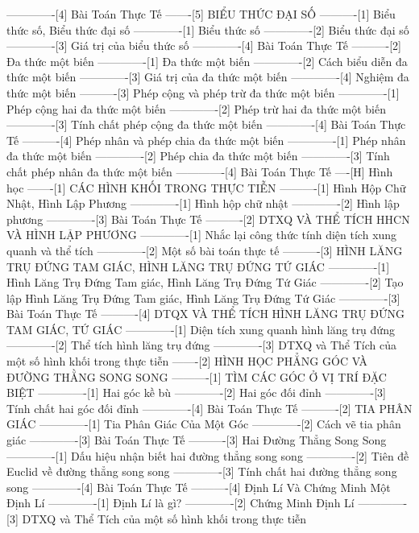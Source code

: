 -------------[4] Bài Toán Thực Tế
-------[5] BIỂU THỨC ĐẠI SỐ
----------[1] Biểu thức số, Biểu thức đại số
-------------[1] Biểu thức số
-------------[2] Biểu thức đại số
-------------[3] Giá trị của biểu thức số
-------------[4] Bài Toán Thực Tế
----------[2] Đa thức một biến
-------------[1] Đa thức một biến
-------------[2] Cách biểu diễn đa thức một biến
-------------[3] Giá trị của đa thức một biến
-------------[4] Nghiệm đa thức một biến
----------[3] Phép cộng và phép trừ đa thức một biến
-------------[1] Phép cộng hai đa thức một biến
-------------[2] Phép trừ hai đa thức một biến
-------------[3] Tính chất phép cộng đa thức một biến
-------------[4] Bài Toán Thực Tế
----------[4] Phép nhân và phép chia đa thức một biến
-------------[1] Phép nhân đa thức một biến
-------------[2] Phép chia đa thức một biến
-------------[3] Tính chất phép nhân đa thức một biến
-------------[4] Bài Toán Thực Tế
----[H] Hình học
-------[1] CÁC HÌNH KHỐI TRONG THỰC TIỄN
----------[1] Hình Hộp Chữ Nhật, Hình Lập Phương
-------------[1] Hình hộp chữ nhật
-------------[2] Hình lập phương
-------------[3] Bài Toán Thực Tế
----------[2] DTXQ VÀ THỂ TÍCH HHCN VÀ HÌNH LẬP PHƯƠNG
-------------[1] Nhắc lại công thức tính diện tích xung quanh và thể tích
-------------[2] Một số bài toán thực tế
----------[3] HÌNH LĂNG TRỤ ĐỨNG TAM GIÁC, HÌNH LĂNG TRỤ ĐỨNG TỨ GIÁC
-------------[1] Hình Lăng Trụ Đứng Tam giác, Hình Lăng Trụ Đứng Tứ Giác
-------------[2] Tạo lập Hình Lăng Trụ Đứng Tam giác, Hình Lăng Trụ Đứng Tứ Giác
-------------[3] Bài Toán Thực Tế
----------[4] DTQX VÀ THỂ TÍCH HÌNH LĂNG TRỤ ĐỨNG TAM GIÁC, TỨ GIÁC
-------------[1] Diện tích xung quanh hình lăng trụ đứng
-------------[2] Thể tích hình lăng trụ đứng
-------------[3] DTXQ và Thể Tích của một số hình khối trong thực tiễn
-------[2] HÌNH HỌC PHẲNG GÓC VÀ ĐƯỜNG THẰNG SONG SONG
----------[1] TÌM CÁC GÓC Ở VỊ TRÍ ĐẶC BIỆT
-------------[1] Hai góc kề bù
-------------[2] Hai góc đối đỉnh
-------------[3] Tính chất hai góc đối đỉnh
-------------[4] Bài Toán Thực Tế
----------[2] TIA PHÂN GIÁC
-------------[1] Tia Phân Giác Của Một Góc
-------------[2] Cách vẽ tia phân giác
-------------[3] Bài Toán Thực Tế
----------[3] Hai Đường Thẳng Song Song
-------------[1] Dấu hiệu nhận biết hai đường thẳng song song
-------------[2] Tiên đề Euclid về đường thẳng song song
-------------[3] Tính chất hai đường thẳng song song
-------------[4] Bài Toán Thực Tế
----------[4] Định Lí Và Chứng Minh Một Định Lí
-------------[1] Định Lí là gì?
-------------[2] Chứng Minh Định Lí
-------------[3] DTXQ và Thể Tích của một số hình khối trong thực tiễn
